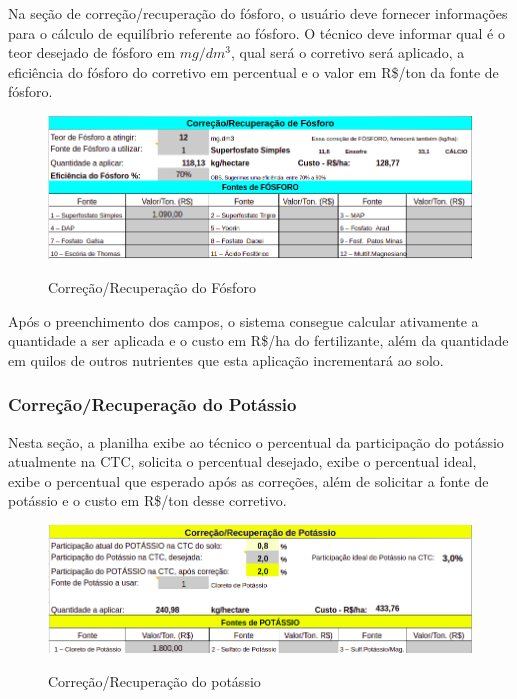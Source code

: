 Na seção de correção/recuperação do fósforo, o usuário deve fornecer informações para o cálculo de equilíbrio referente ao fósforo. O técnico deve informar qual é o teor desejado de fósforo em \(mg/dm^3\), qual será o corretivo será aplicado, a eficiência do fósforo do corretivo em percentual e o valor em R\$/ton da fonte de fósforo.

\begin{figure}[H]
    \centering
    \caption{Correção/Recuperação do Fósforo}
    \includegraphics[width=13cm]{./dados/figuras/planilha/corr_rec_fosforo.png}
    \label{fig:correcaorecfosforo}
\end{figure}

Após o preenchimento dos campos, o sistema consegue calcular ativamente a quantidade a ser aplicada e o custo em R\$/ha do fertilizante, além da quantidade em quilos de outros nutrientes que esta aplicação incrementará ao solo.

\subsubsection{Correção/Recuperação do Potássio}
\label{subsubsec:corrrecpotassio}

Nesta seção, a planilha exibe ao técnico o percentual da participação do potássio atualmente na CTC, solicita o percentual desejado, exibe o percentual ideal, exibe o percentual que esperado após as correções, além de solicitar a fonte de potássio e o custo em R\$/ton desse corretivo.

\begin{figure}[H]
    \centering
    \caption{Correção/Recuperação do potássio}
    \includegraphics[width=13cm]{./dados/figuras/planilha/corr_rec_potassio.png}
    \label{fig:correcaorecpotassio}
\end{figure}

